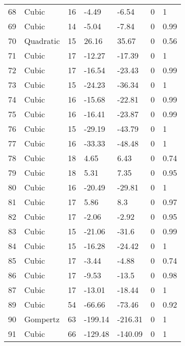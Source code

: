\documentclass[11pt]{article}
\begin{document}
\begin{center}
\begin{longtable}{lllllll}
    68  & Cubic     & 16              & -4.49   & -6.54   & 0       & 1    \\
    69  & Cubic     & 14              & -5.04   & -7.84   & 0       & 0.99 \\
    70  & Quadratic & 15              & 26.16   & 35.67   & 0       & 0.56 \\
    71  & Cubic     & 17              & -12.27  & -17.39  & 0       & 1    \\
    72  & Cubic     & 17              & -16.54  & -23.43  & 0       & 0.99 \\
    73  & Cubic     & 15              & -24.23  & -36.34  & 0       & 1    \\
    74  & Cubic     & 16              & -15.68  & -22.81  & 0       & 0.99 \\
    75  & Cubic     & 16              & -16.41  & -23.87  & 0       & 0.99 \\
    76  & Cubic     & 15              & -29.19  & -43.79  & 0       & 1    \\
    77  & Cubic     & 16              & -33.33  & -48.48  & 0       & 1    \\
    78  & Cubic     & 18              & 4.65    & 6.43    & 0       & 0.74 \\
    79  & Cubic     & 18              & 5.31    & 7.35    & 0       & 0.95 \\
    80  & Cubic     & 16              & -20.49  & -29.81  & 0       & 1    \\
    81  & Cubic     & 17              & 5.86    & 8.3     & 0       & 0.97 \\
    82  & Cubic     & 17              & -2.06   & -2.92   & 0       & 0.95 \\
    83  & Cubic     & 15              & -21.06  & -31.6   & 0       & 0.99 \\
    84  & Cubic     & 15              & -16.28  & -24.42  & 0       & 1    \\
    85  & Cubic     & 17              & -3.44   & -4.88   & 0       & 0.74 \\
    86  & Cubic     & 17              & -9.53   & -13.5   & 0       & 0.98 \\
    87  & Cubic     & 17              & -13.01  & -18.44  & 0       & 1    \\
    89  & Cubic     & 54              & -66.66  & -73.46  & 0       & 0.92 \\
    90  & Gompertz  & 63              & -199.14 & -216.31 & 0       & 1    \\
    91  & Cubic     & 66              & -129.48 & -140.09 & 0       & 1    \\

\end{longtable}
\end{center}
\end{document}
